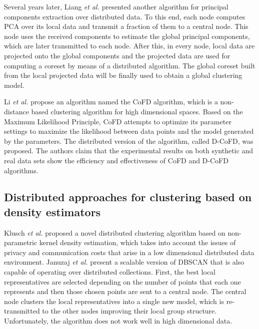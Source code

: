 \documentclass[smallextended]{svjour3}       %
\begin{document}
Several years later, Liang \textit{et al.} \cite{LBK13} presented another algorithm for principal components extraction over distributed data. To this end, each node computes PCA over its local data and transmit a fraction of them to a central node. This node uses the received components to estimate the global principal components, which are later transmitted to each node. After this, in every node, local data are projected onto the global components and the projected data are used for computing a coreset by means of a distributed algorithm. The global coreset built from the local projected data will be finally used to obtain a global clustering model.  

Li \textit{et al.} \cite{LZO03} propose an algorithm named the CoFD algorithm, which is a non-distance based clustering algorithm for high dimensional spaces. Based on the Maximum Likelihood Principle, CoFD attempts to optimize its parameter settings to maximize the likelihood between data points and the model generated by the parameters. The distributed version of the algorithm, called D-CoFD, was proposed. The authors claim that the experimental results on both synthetic and real data sets show the efficiency and effectiveness of CoFD and D-CoFD algorithms.

\subsection{Distributed approaches for clustering based on density estimators}

Klusch \textit{et al.} \cite{KLM03} proposed a novel distributed clustering algorithm based on non-parametric kernel density estimation, which takes into account the issues of privacy and communication costs that arise in a low dimensional distributed data environment. %
Januzaj \textit{et al.} \cite{JKP04} present a scalable version of DBSCAN that is also capable of operating over distributed collections. First, the best local representatives are selected depending on the number of points that each one represents and then those chosen points are sent to a central node. The central node clusters the local representatives into a single new model, which is re-transmitted to the other nodes improving their local group structure. Unfortunately, the algorithm does not work well in high dimensional data. 
\end{document}
